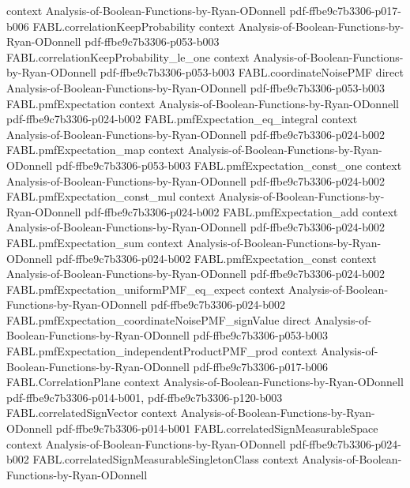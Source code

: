 \begin{theorem}
  {context}
  {Analysis-of-Boolean-Functions-by-Ryan-ODonnell}
  {pdf-ffbe9c7b3306-p017-b006}
\proofstep
  {FABL.correlationKeepProbability}
  {context}
  {Analysis-of-Boolean-Functions-by-Ryan-ODonnell}
  {pdf-ffbe9c7b3306-p053-b003}
\proofstep
  {FABL.correlationKeepProbability_le_one}
  {context}
  {Analysis-of-Boolean-Functions-by-Ryan-ODonnell}
  {pdf-ffbe9c7b3306-p053-b003}
\proofstep
  {FABL.coordinateNoisePMF}
  {direct}
  {Analysis-of-Boolean-Functions-by-Ryan-ODonnell}
  {pdf-ffbe9c7b3306-p053-b003}
\proofstep
  {FABL.pmfExpectation}
  {context}
  {Analysis-of-Boolean-Functions-by-Ryan-ODonnell}
  {pdf-ffbe9c7b3306-p024-b002}
\proofstep
  {FABL.pmfExpectation_eq_integral}
  {context}
  {Analysis-of-Boolean-Functions-by-Ryan-ODonnell}
  {pdf-ffbe9c7b3306-p024-b002}
\proofstep
  {FABL.pmfExpectation_map}
  {context}
  {Analysis-of-Boolean-Functions-by-Ryan-ODonnell}
  {pdf-ffbe9c7b3306-p053-b003}
\proofstep
  {FABL.pmfExpectation_const_one}
  {context}
  {Analysis-of-Boolean-Functions-by-Ryan-ODonnell}
  {pdf-ffbe9c7b3306-p024-b002}
\proofstep
  {FABL.pmfExpectation_const_mul}
  {context}
  {Analysis-of-Boolean-Functions-by-Ryan-ODonnell}
  {pdf-ffbe9c7b3306-p024-b002}
\proofstep
  {FABL.pmfExpectation_add}
  {context}
  {Analysis-of-Boolean-Functions-by-Ryan-ODonnell}
  {pdf-ffbe9c7b3306-p024-b002}
\proofstep
  {FABL.pmfExpectation_sum}
  {context}
  {Analysis-of-Boolean-Functions-by-Ryan-ODonnell}
  {pdf-ffbe9c7b3306-p024-b002}
\proofstep
  {FABL.pmfExpectation_const}
  {context}
  {Analysis-of-Boolean-Functions-by-Ryan-ODonnell}
  {pdf-ffbe9c7b3306-p024-b002}
\proofstep
  {FABL.pmfExpectation_uniformPMF_eq_expect}
  {context}
  {Analysis-of-Boolean-Functions-by-Ryan-ODonnell}
  {pdf-ffbe9c7b3306-p024-b002}
\proofstep
  {FABL.pmfExpectation_coordinateNoisePMF_signValue}
  {direct}
  {Analysis-of-Boolean-Functions-by-Ryan-ODonnell}
  {pdf-ffbe9c7b3306-p053-b003}
\proofstep
  {FABL.pmfExpectation_independentProductPMF_prod}
  {context}
  {Analysis-of-Boolean-Functions-by-Ryan-ODonnell}
  {pdf-ffbe9c7b3306-p017-b006}
\proofstep
  {FABL.CorrelationPlane}
  {context}
  {Analysis-of-Boolean-Functions-by-Ryan-ODonnell}
  {pdf-ffbe9c7b3306-p014-b001,
    pdf-ffbe9c7b3306-p120-b003}
\proofstep
  {FABL.correlatedSignVector}
  {context}
  {Analysis-of-Boolean-Functions-by-Ryan-ODonnell}
  {pdf-ffbe9c7b3306-p014-b001}
\proofstep
  {FABL.correlatedSignMeasurableSpace}
  {context}
  {Analysis-of-Boolean-Functions-by-Ryan-ODonnell}
  {pdf-ffbe9c7b3306-p024-b002}
\proofstep
  {FABL.correlatedSignMeasurableSingletonClass}
  {context}
  {Analysis-of-Boolean-Functions-by-Ryan-ODonnell}

\end{theorem}

